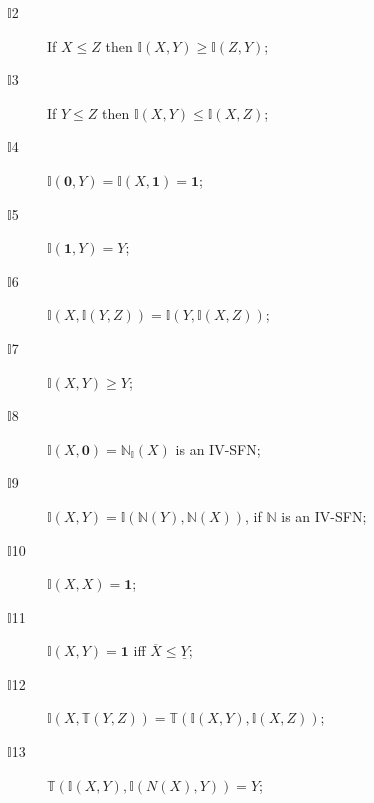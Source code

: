 \documentclass[12pt]{article}
\theoremstyle{plain}
\theoremstyle{remark}
\theoremstyle{definition}
\theoremstyle{proposition}
\begin{document}
\begin{description}
\item [$\mathbb{I}$2] If $X \leq Z$ then $\mathbb{I}(X,Y) \geq \mathbb{I}(Z,Y)$;
\item [$\mathbb{I}$3] If $Y \leq Z$ then $\mathbb{I}(X,Y) \leq \mathbb{I}(X,Z)$;
\item [$\mathbb{I}$4] $\mathbb{I}(\mathbf{0},Y) = \mathbb{I}(X,\mathbf{1})=\mathbf{1}$;
\item [$\mathbb{I}$5] $\mathbb{I}(\mathbf{1},Y) = Y$;
\item [$\mathbb{I}$6] $\mathbb{I}(X,\mathbb{I}(Y,Z))= \mathbb{I}(Y,\mathbb{I}(X,Z))$;
\item [$\mathbb{I}$7] $\mathbb{I}(X,Y) \geq Y $;
\item [$\mathbb{I}$8] $\mathbb{I}(X,\mathbf{0}) = \mathbb{N}_{\mathbb{I}}(X)$ is an IV-SFN;
\item [$\mathbb{I}$9] $\mathbb{I}(X,Y)=  \mathbb{I}(\mathbb{N}(Y),\mathbb{N}(X))$, if $\mathbb{N}$ is an IV-SFN;
\item [$\mathbb{I}$10] $\mathbb{I}(X,X)=\mathbf{1}$;
\item [$\mathbb{I}$11] $\mathbb{I}(X,Y)=\mathbf{1}$ iff $\overline{X}\leq \underline{Y}$;
%
\item [$\mathbb{I}$12] $\mathbb{I}(X,\mathbb{T}(Y,Z))=  \mathbb{T}(\mathbb{I}(X,Y),\mathbb{I}(X,Z))$;
\item [$\mathbb{I}$13] $\mathbb{T}(\mathbb{I}(X,Y),\mathbb{I}(N(X),Y))=Y$;
\end{description}
\end{document}
